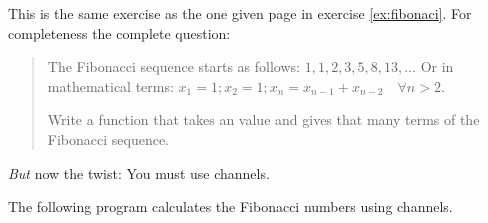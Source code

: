 \begin{Exercise}[title={Fibonacci II},difficulty=2]
\label{ex:fibonaci II}
\Question\label{ex:fibonaci II q1}
This is the same exercise as the one given page \pageref{ex:fibonaci} 
in exercise \ref{ex:fibonaci}. For completeness the complete question:

\begin{quote}
The Fibonacci sequence starts as follows: $1, 1, 2, 3, 5, 8, 13, \ldots$
Or in mathematical terms: $ x_1 = 1; x_2 = 1; x_n = x_{n-1} +
x_{n-2}\quad\forall n > 2 $.

Write a function that takes an  value and gives 
that many terms of the Fibonacci sequence.
\end{quote}
\emph{But} now the twist: You must use channels.

\end{Exercise}

\begin{Answer}
\Question
The following program calculates the Fibonacci numbers using channels.

\end{Answer}



